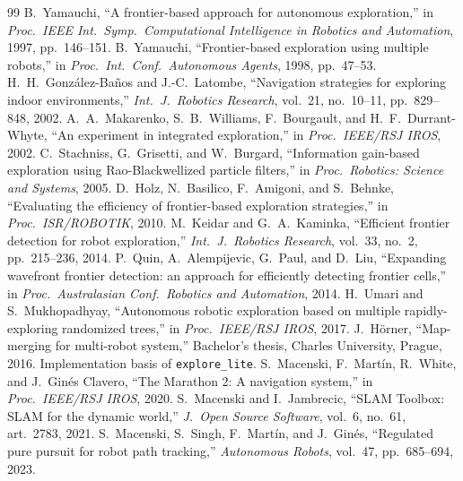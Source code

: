 \documentclass[11pt]{article}
\begin{document}
\begin{thebibliography}{99}
 B.~Yamauchi, ``A frontier-based approach for autonomous exploration,'' in \emph{Proc.\ IEEE Int.\ Symp.\ Computational Intelligence in Robotics and Automation}, 1997, pp.~146--151.
 B.~Yamauchi, ``Frontier-based exploration using multiple robots,'' in \emph{Proc.\ Int.\ Conf.\ Autonomous Agents}, 1998, pp.~47--53.
 H.~H.~Gonz\'alez-Ba\~nos and J.-C.~Latombe, ``Navigation strategies for exploring indoor environments,'' \emph{Int.\ J.\ Robotics Research}, vol.~21, no.~10--11, pp.~829--848, 2002.
 A.~A.~Makarenko, S.~B.~Williams, F.~Bourgault, and H.~F.~Durrant-Whyte, ``An experiment in integrated exploration,'' in \emph{Proc.\ IEEE/RSJ IROS}, 2002.
 C.~Stachniss, G.~Grisetti, and W.~Burgard, ``Information gain-based exploration using Rao-Blackwellized particle filters,'' in \emph{Proc.\ Robotics: Science and Systems}, 2005.
 D.~Holz, N.~Basilico, F.~Amigoni, and S.~Behnke, ``Evaluating the efficiency of frontier-based exploration strategies,'' in \emph{Proc.\ ISR/ROBOTIK}, 2010.
 M.~Keidar and G.~A.~Kaminka, ``Efficient frontier detection for robot exploration,'' \emph{Int.\ J.\ Robotics Research}, vol.~33, no.~2, pp.~215--236, 2014.
 P.~Quin, A.~Alempijevic, G.~Paul, and D.~Liu, ``Expanding wavefront frontier detection: an approach for efficiently detecting frontier cells,'' in \emph{Proc.\ Australasian Conf.\ Robotics and Automation}, 2014.
 H.~Umari and S.~Mukhopadhyay, ``Autonomous robotic exploration based on multiple rapidly-exploring randomized trees,'' in \emph{Proc.\ IEEE/RSJ IROS}, 2017.
 J.~H\"orner, ``Map-merging for multi-robot system,'' Bachelor's thesis, Charles University, Prague, 2016. Implementation basis of \texttt{explore\_lite}.
 S.~Macenski, F.~Mart\'in, R.~White, and J.~Gin\'es Clavero, ``The Marathon 2: A navigation system,'' in \emph{Proc.\ IEEE/RSJ IROS}, 2020.
 S.~Macenski and I.~Jambrecic, ``SLAM Toolbox: SLAM for the dynamic world,'' \emph{J.\ Open Source Software}, vol.~6, no.~61, art.~2783, 2021.
 S.~Macenski, S.~Singh, F.~Mart\'in, and J.~Gin\'es, ``Regulated pure pursuit for robot path tracking,'' \emph{Autonomous Robots}, vol.~47, pp.~685--694, 2023.
\end{thebibliography}
\end{document}
